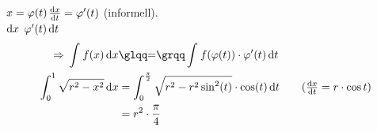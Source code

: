 \begin{notation}
    $x=\varphi\of{t}$\quad $\frac{\dif x}{\dif t} = \varphi'\of{t}$ (informell).\\
    $\mathop{}\!\mathrm{d} x$ \anf{=} $\varphi'\of{t}\dif t$
    \begin{align*}
        \impl \int_{}^{} f\of{x} \dif x &\text{\anf{=}} \int_{}^{} f\of{\varphi\of{t}}\cdot\varphi'\of{t} \dif t\\
        \int_{0}^{1} \sqrt{r^2-x^2} \dif x &= \int_{0}^{\frac{\pi}{2}} \sqrt{r^2-r^2\sin^2\of{t}}\cdot\cos\of{t} \dif t\tag{$\frac{\dif x}{\dif t} = r\cdot\cos t$}\\
        &= r^2\cdot\frac{\pi}{4}
    \end{align*}
\end{notation}

\newpage
